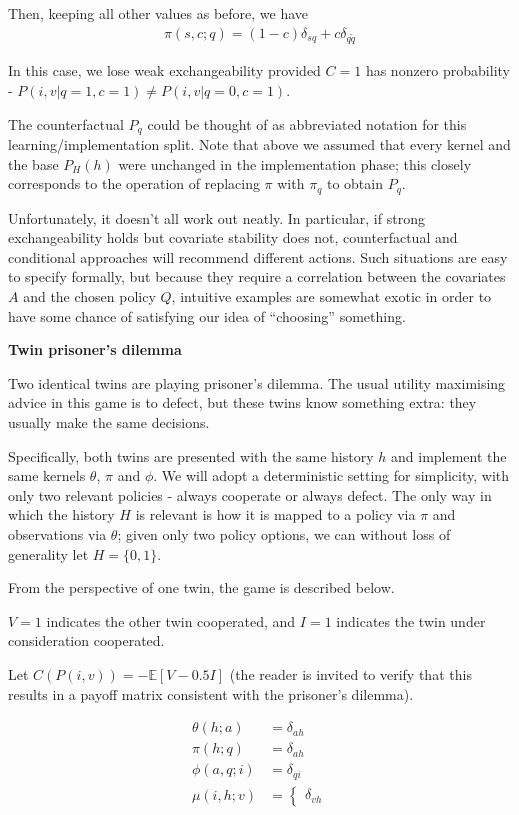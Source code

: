 Then, keeping all other values as before, we have
\begin{align}
    \pi(s,c;q) = (1-c)\delta_{sq} + c\delta_{q\tilde{q}}
\end{align}

In this case, we lose weak exchangeability provided $C=1$ has nonzero probability - $P(i,v|q=1,c=1)\neq P(i,v|q=0,c=1)$.

The counterfactual $P_q$ could be thought of as abbreviated notation for this learning/implementation split. Note that above we assumed that every kernel and the base $P_H(h)$ were unchanged in the implementation phase; this closely corresponds to the operation of replacing $\pi$ with $\pi_q$ to obtain $P_q$. 

Unfortunately, it doesn't all work out neatly. In particular, if strong exchangeability holds but covariate stability does not, counterfactual and conditional approaches will recommend different actions. Such situations are easy to specify formally, but because they require a correlation between the covariates $A$ and the chosen policy $Q$, intuitive examples are somewhat exotic in order to have some chance of satisfying our idea of ``choosing'' something. 

\textbf{Twin prisoner's dilemma}

Two identical twins are playing prisoner's dilemma. The usual utility maximising advice in this game is to defect, but these twins know something extra: they usually make the same decisions.

Specifically, both twins are presented with the same history $h$ and implement the same kernels $\theta$, $\pi$ and $\phi$. We will adopt a deterministic setting for simplicity, with only two relevant policies - always cooperate or always defect. The only way in which the history $H$ is relevant is how it is mapped to a policy via $\pi$ and observations via $\theta$; given only two policy options, we can without loss of generality let $H=\{0,1\}$. 

From the perspective of one twin, the game is described below.

$V=1$ indicates the other twin cooperated, and $I=1$ indicates the twin under consideration cooperated.

Let $C(P(i,v)) = -\mathbb{E}[V-0.5I]$ (the reader is invited to verify that this results in a payoff matrix consistent with the prisoner's dilemma).

\begin{align}
    \theta(h;a) &= \delta_{ah}\\
    \pi(h;q) &= \delta_{ah}\\
    \phi(a,q;i) &= \delta_{q i}\\
    \mu(i,h;v) &= \begin{cases} \delta_{vh}
    \end{cases}
\end{align}

